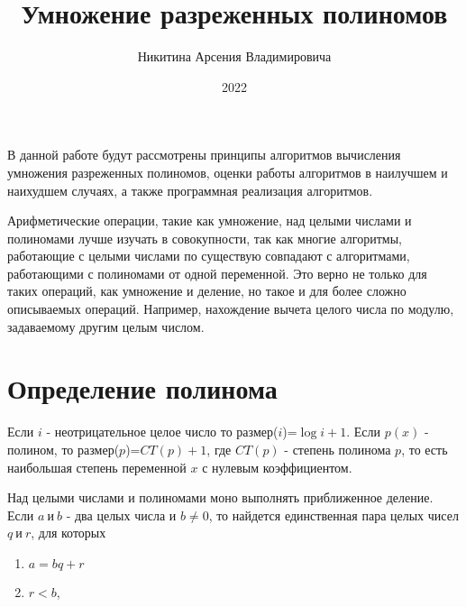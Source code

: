 \documentclass[bachelor, och, labwork]{shiza}
\begin{document}

\title{Умножение разреженных полиномов}





\author{Никитина Арсения Владимировича}



\date{2022}

\maketitle

\tableofcontents

\intro
В данной работе будут рассмотрены принципы алгоритмов вычисления умножения 
разреженных полиномов, оценки работы алгоритмов в наилучшем и наихудшем случаях,
а также программная реализация алгоритмов. 

Арифметические операции, такие как умножение, над целыми числами и полиномами
лучше изучать в совокупности, так как многие алгоритмы, работающие с целыми 
числами по существую совпадают с алгоритмами, работающими с полиномами от одной
переменной. Это верно не только для таких операций, как умножение и деление, но
такое и для более сложно описываемых операций. Например, нахождение вычета
целого числа по модулю, задаваемому другим целым числом.


\section{Определение полинома}

Если $i$ - неотрицательное целое число то размер($i$)=$\log i + 1$. Если $p(x)$
- полином, то размер($p$)=$CT(p) + 1$, где $CT(p)$ - степень полинома $p$, то
есть наибольшая степень переменной $x$ с нулевым коэффициентом.

Над целыми числами и полиномами моно выполнять приближенное деление. Если 
$a ~\text{и}~ b$ - два целых числа и $b \not= 0$, то найдется единственная пара
целых чисел $q ~\text{и}~ r$, для которых
\begin{enumerate}
    \item $a=bq + r$
    \item $r<b$,
\end{enumerate}
\end{document}
